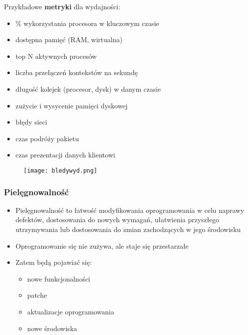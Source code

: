 \documentclass[../main.tex]{subfiles}
\begin{document}
    Przykładowe \textbf{metryki} dla wydajności:
    \begin{itemize}
        \item \% wykorzystania procesora w kluczowym czasie
        \item dostępna pamięć (RAM, wirtualna)
        \item top N aktywnych procesów
        \item liczba przełączeń kontekstów na sekundę
        \item długość kolejek (procesor, dysk) w danym czasie
        \item zużycie i wysycenie pamięci dyskowej
        \item błędy sieci
        \item czas podróży pakietu
        \item czas prezentacji danych klientowi
    \end{itemize}

    \begin{figure}[H]
        \texttt{[image: bledywyd.png]}
    \end{figure}

    \subsubsection{Pielęgnowalność}
    \begin{itemize}
        \item Pielęgnowalność to łatwość modyfikowania oprogramowania w celu naprawy defektów, dostosowania do nowych
        wymagań, ułatwienia przyszłego utrzymywania lub dostosowania do zmian zachodzących w jego środowisku
        \item Oprogramowanie się nie zużywa, ale staje się przestarzałe
        \item Zatem będą pojawiać się:
        \begin{itemize}
            \item nowe funkcjonalności
            \item patche
            \item aktualizacje oprogramowania
            \item nowe środowiska
        \end{itemize}
    \end{itemize}
\end{document}

